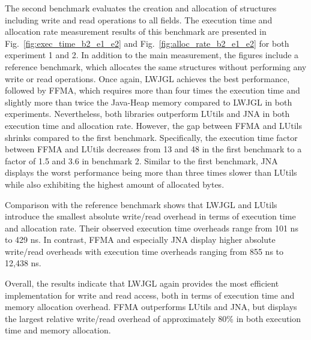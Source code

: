 
The second benchmark evaluates the creation and allocation of structures including write and read operations to all fields.
The execution time and allocation rate measurement results of this benchmark are presented in
Fig.~\ref{fig:exec_time_b2_e1_e2} and Fig.~\ref{fig:alloc_rate_b2_e1_e2} for both experiment 1 and 2.
In addition to the main measurement, the figures include a reference benchmark, which allocates the same structures without
performing any write or read operations.
Once again, LWJGL achieves the best performance, followed by FFMA, which requires more than four times the execution time
and slightly more than twice the Java-Heap memory compared to LWJGL in both experiments.
Nevertheless, both libraries outperform LUtils and JNA in both execution time and allocation rate.
However, the gap between FFMA and LUtils shrinks compared to the first benchmark.
Specifically, the execution time factor between FFMA and LUtils decreases from 13 and 48 in the first benchmark to a factor
of 1.5 and 3.6 in benchmark 2.
Similar to the first benchmark, JNA displays the worst performance being more than three times slower than LUtils while also exhibiting the
highest amount of allocated bytes.

Comparison with the reference benchmark shows that LWJGL and LUtils introduce the smallest absolute write/read overhead in
terms of execution time and allocation rate.
Their observed execution time overheads range from 101 ns to 429 ns.
In contrast, FFMA and especially JNA display higher absolute write/read overheads with execution time overheads ranging
from 855 ns to 12,438 ns.

Overall, the results indicate that LWJGL again provides the most efficient implementation for write and read access,
both in terms of execution time and memory allocation overhead.
FFMA outperforms LUtils and JNA, but displays the largest relative write/read overhead of approximately 80\%
in both execution time and memory allocation.


